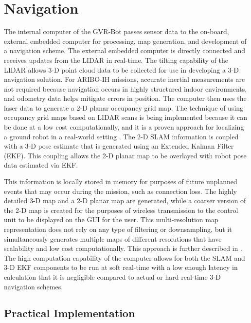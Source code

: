 \section{Navigation}\label{sec:navigation}

The internal computer of the GVR-Bot passes sensor data to the on-board, external embedded computer for processing, map generation, and development of a navigation scheme. The external embedded computer is directly connected and receives updates from the LIDAR in real-time. The tilting capability of the LIDAR allows 3-D point cloud data to be collected for use in developing a 3-D navigation solution. For ARIBO-IH missions, accurate inertial measurements are not required because navigation occurs in highly structured indoor environments, and odometry data helps mitigate errors in position. The computer then uses the laser data to generate a 2-D planar occupancy grid map. The technique of using occupancy grid maps based on LIDAR scans is being implemented because it can be done at a low cost computationally, and it is a proven approach for localizing a ground robot in a real-world setting \cite{thrun2005probabilistic,kohlbrecher2011flexible}. The 2-D SLAM information is coupled with a 3-D pose estimate that is generated using an Extended Kalman Filter (EKF). This coupling allows the 2-D planar map to be overlayed with robot pose data estimated via EKF. 

This information is locally stored in memory for purposes of future unplanned events that may occur during the mission, such as connection loss. The highly detailed 3-D map and a 2-D planar map are generated, while a coarser version of the 2-D map is created for the purposes of wireless transmission to the control unit to be displayed on the GUI for the user. This multi-resolution map representation does not rely on any type of filtering or downsampling, but it simultaneously generates multiple maps of different resolutions that have scalability and low cost computationally. This approach is further described in \cite{kohlbrecher2011flexible,habbecke2006iterative}. The high computation capability of the computer allows for both the SLAM and 3-D EKF components to be run at soft real-time with a low enough latency in calculation that it is negligible compared to actual or hard real-time 3-D navigation schemes.

\subsection{Practical Implementation}\label{sec:practical}

